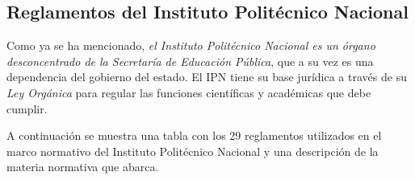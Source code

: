 \subsection{Reglamentos del Instituto Politécnico Nacional}

Como ya se ha mencionado, \textit{el Instituto Politécnico Nacional es un órgano desconcentrado de la Secretaría de
Educación Pública}, que a su vez es una dependencia del gobierno del estado. El IPN tiene su base jurídica a través de su \textit{Ley Orgánica} para regular las funciones científicas y académicas que debe cumplir.

A continuación se muestra una tabla con los 29 reglamentos utilizados en el marco normativo del Instituto Politécnico Nacional y una descripción de la materia normativa que abarca.

\newpage

